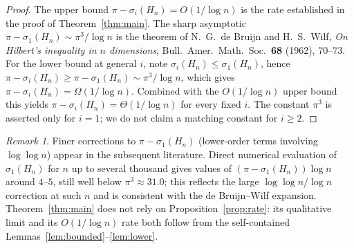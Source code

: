 \documentclass[12pt]{article}
\theoremstyle{remark}
\newtheorem*{remark}{Remark}
\begin{document}
\begin{proof}
The upper bound $\pi-\sigma_i(H_n)=O(1/\log n)$ is the rate established in the proof of
Theorem~\ref{thm:main}. The sharp asymptotic
$\pi-\sigma_1(H_n)\sim\pi^3/\log n$ is the theorem of N.~G.~de Bruijn and H.~S.~Wilf,
\emph{On Hilbert's inequality in $n$ dimensions}, Bull.\ Amer.\ Math.\ Soc.\ \textbf{68} (1962),
70--73. For the lower bound at general $i$, note $\sigma_i(H_n)\le\sigma_1(H_n)$, hence
$\pi-\sigma_i(H_n)\ge\pi-\sigma_1(H_n)\sim\pi^3/\log n$, which gives
$\pi-\sigma_i(H_n)=\Omega(1/\log n)$. Combined with the $O(1/\log n)$ upper bound this yields
$\pi-\sigma_i(H_n)=\Theta(1/\log n)$ for every fixed $i$. The constant $\pi^3$ is asserted only for
$i=1$; we do not claim a matching constant for $i\ge2$.
\end{proof}

\begin{remark}
Finer corrections to $\pi-\sigma_1(H_n)$ (lower-order terms involving $\log\log n$) appear in the
subsequent literature. Direct numerical evaluation of $\sigma_1(H_n)$ for $n$ up to several
thousand gives values of $(\pi-\sigma_1(H_n))\log n$ around $4$--$5$, still well below
$\pi^3\approx31.0$; this reflects the large $\log\log n/\log n$ correction at such $n$ and is
consistent with the de Bruijn--Wilf expansion. Theorem~\ref{thm:main} does not rely on
Proposition~\ref{prop:rate}: its qualitative limit and its $O(1/\log n)$ rate both follow from the
self-contained Lemmas~\ref{lem:bounded}--\ref{lem:lower}.
\end{remark}
\end{document}
